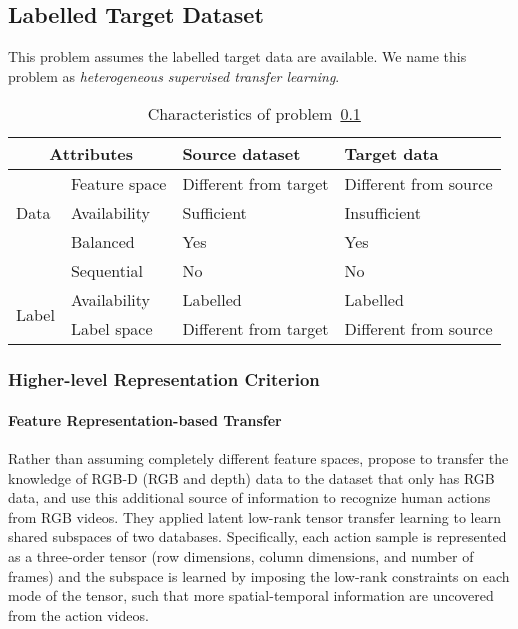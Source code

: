 \documentclass[prodmode]{acmsmall}  %
\begin{document}
\subsection{Labelled Target Dataset}
\label{sec:HETEFLsup}
This problem assumes the labelled target data are available. We name this problem as \textit{heterogeneous supervised transfer learning}.
\begin{table}[htbp!]
\caption{Characteristics of problem~\ref{sec:HETEFLsup}}
\label{tab:HETEFLsup}
\begin{center}
\begin{small}
\begin{tabular}{|p{1cm}<{\centering}|m{2.5cm}<{\centering}|m{4.3cm}<{\centering}|m{4.3cm}<{\centering}|}
\hline
\multicolumn{2}{|c|}{Attributes} & Source dataset & Target data \\
\hline \hline
\multirow{3}{*}{Data} & Feature space & Different from target & {\color{red}Different from source} \\ 
\cline{2-4}{} & Availability & Sufficient & {\color{red}Insufficient} \\
\cline{2-4}{} & Balanced & Yes & Yes \\
\cline{2-4}{} & Sequential & No & No \\
\hline \hline
\multirow{2}{*}{Label} & Availability & Labelled & Labelled \\
\cline{2-4}{}  & Label space & Different from target & {\color{red}Different from source} \\ 
\hline
\end{tabular}
\end{small}
\end{center}
\end{table}

\subsubsection{Higher-level Representation Criterion}
\paragraph{Feature Representation-based Transfer}
Rather than assuming completely different feature spaces,  propose to transfer the knowledge of RGB-D (RGB and depth) data to the dataset that only has RGB data, and use this additional source of information to recognize human actions from RGB videos. They applied latent low-rank tensor transfer learning to learn shared subspaces of two databases. Specifically, each action sample is represented as a three-order tensor (row dimensions, column dimensions, and number of frames) and the subspace is learned by imposing the low-rank constraints on each mode of the tensor, such that more spatial-temporal information are uncovered from the action videos. 
\end{document}
